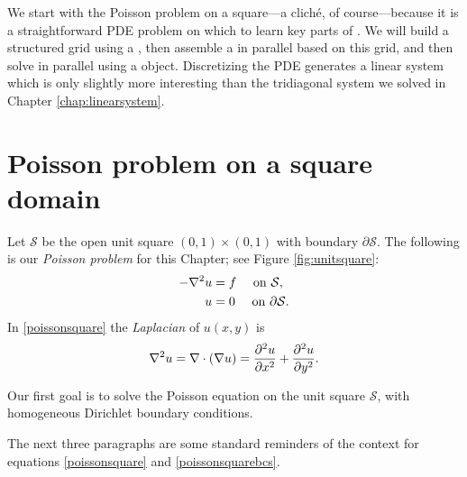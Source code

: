 
We start with the Poisson problem on a square---a clich\'e, of course---because it is a straightforward PDE problem on which to learn key parts of \PETSc.  We will build a structured grid using a \pDMDA, then assemble a \pMat in parallel based on this grid, and then solve in parallel using a \pKSP object.  Discretizing the PDE generates a linear system which is only slightly more interesting than the tridiagonal system we solved in Chapter \ref{chap:linearsystem}.

\section{Poisson problem on a square domain}

Let $\mathcal{S}$ be the open unit square $(0,1)\times(0,1)$ with boundary $\partial\mathcal{S}$.  The following is our \emph{Poisson problem} for this Chapter;  see Figure \ref{fig:unitsquare}:
\begin{align}
- \nabla^2 u &= f \quad \text{ on } \mathcal{S}, \label{poissonsquare} \\
u &= 0 \quad \text{ on } \partial \mathcal{S}. \label{poissonsquarebcs}
\end{align}
In \eqref{poissonsquare} the \emph{Laplacian} of $u(x,y)$ is
    $$\nabla^2 u = \nabla\cdot(\nabla u) = \frac{\partial^2 u}{\partial x^2} + \frac{\partial^2 u}{\partial y^2}.$$

\begin{marginfigure}
\caption{Our first goal is to solve the Poisson equation on the unit square $\mathcal{S}$, with homogeneous Dirichlet boundary conditions.}
\label{fig:unitsquare}
\end{marginfigure}

The next three paragraphs are some standard reminders of the context for equations \eqref{poissonsquare} and \eqref{poissonsquarebcs}.

